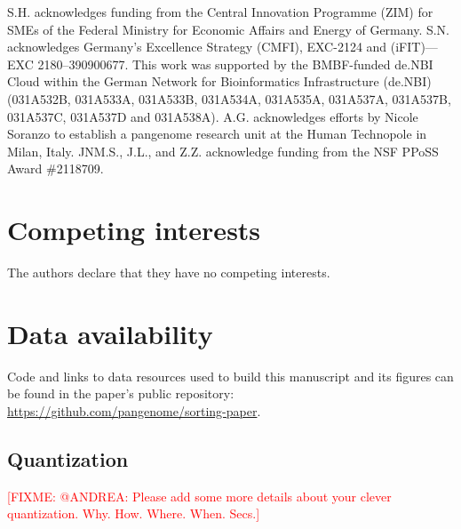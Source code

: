\documentclass{bioinfo}
\theoremstyle{definition}
\newcommand{\red}[1]{{\textcolor{Red}{#1}}}
\newcommand{\FIXME}[1]{\red{[FIXME: #1]}}
\begin{document}
    S.H. acknowledges funding from the Central Innovation Programme (ZIM) for SMEs of the Federal Ministry for Economic Affairs and Energy of Germany.
    S.N. acknowledges Germany’s Excellence Strategy (CMFI), EXC-2124 and (iFIT)—EXC 2180–390900677.
    This work was supported by the BMBF-funded de.NBI Cloud within the German Network for Bioinformatics Infrastructure (de.NBI) (031A532B, 031A533A, 031A533B, 031A534A, 031A535A, 031A537A, 031A537B, 031A537C, 031A537D and 031A538A).
    A.G. acknowledges efforts by Nicole Soranzo to establish a pangenome research unit at the Human Technopole in Milan, Italy.
    JNM.S., J.L., and Z.Z. acknowledge funding from the NSF PPoSS Award \#2118709.

    \section*{Competing interests}
    The authors declare that they have no competing interests.

    \section*{Data availability}

    Code and links to data resources used to build this manuscript and its figures can be found in the paper's public repository: \url{https://github.com/pangenome/sorting-paper}.

    

    

    \begin{appendices}
        \section{Quantization}
        \FIXME{@ANDREA: Please add some more details about your clever quantization. Why. How. Where. When. Secs.}
    \end{appendices}
\end{document}
